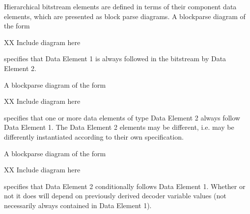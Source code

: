 Hierarchical bitstream elements are defined in terms of their component
data elements, which are presented as block parse diagrams.  A
blockparse diagram of the form

XX Include diagram here

specifies that Data Element 1 is always followed in the bitstream by
Data Element 2.

A blockparse diagram of the form

XX Include diagram here

specifies that one or more data elements of type Data Element 2 always
follow Data Element 1. The Data Element 2 elements may be different,
i.e. may be differently instantiated according to their own
specification.

A blockparse diagram of the form

XX Include diagram here

specifies that Data Element 2 conditionally follows Data Element 1.
Whether or not it does will depend on previously derived decoder
variable values (not necessarily always contained in Data Element 1).

